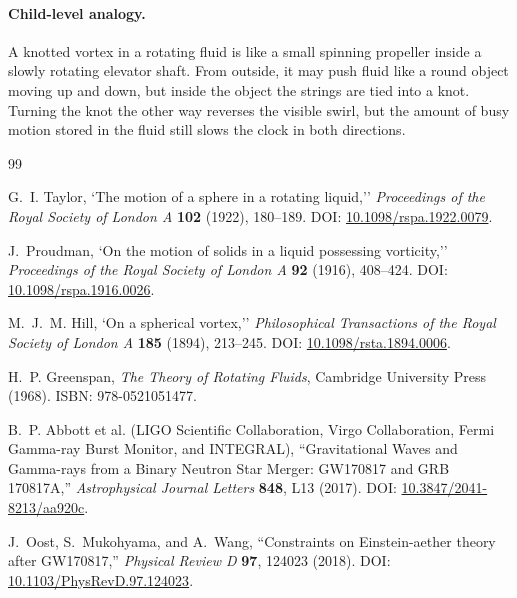 \paragraph{Child-level analogy.}
A knotted vortex in a rotating fluid is like a small spinning propeller inside a
slowly rotating elevator shaft.  From outside, it may push fluid like a round
object moving up and down, but inside the object the strings are tied into a
knot.  Turning the knot the other way reverses the visible swirl, but the amount
of busy motion stored in the fluid still slows the clock in both directions.


\ifresearchtrackincluded\else
\begin{thebibliography}{99}


G.~I. Taylor,
`The motion of a sphere in a rotating liquid,''
\emph{Proceedings of the Royal Society of London A} \textbf{102} (1922), 180--189.
DOI: \href{https://doi.org/10.1098/rspa.1922.0079}{10.1098/rspa.1922.0079}.

J.~Proudman,
`On the motion of solids in a liquid possessing vorticity,''
\emph{Proceedings of the Royal Society of London A} \textbf{92} (1916), 408--424.
DOI: \href{https://doi.org/10.1098/rspa.1916.0026}{10.1098/rspa.1916.0026}.

M.~J.~M. Hill,
`On a spherical vortex,''
\emph{Philosophical Transactions of the Royal Society of London A} \textbf{185} (1894), 213--245.
DOI: \href{https://doi.org/10.1098/rsta.1894.0006}{10.1098/rsta.1894.0006}.

H.~P. Greenspan,
\emph{The Theory of Rotating Fluids},
Cambridge University Press (1968).
ISBN: 978-0521051477.

B.~P. Abbott et al. (LIGO Scientific Collaboration, Virgo Collaboration, Fermi Gamma-ray Burst Monitor, and INTEGRAL),
``Gravitational Waves and Gamma-rays from a Binary Neutron Star Merger: GW170817 and GRB 170817A,''
\emph{Astrophysical Journal Letters} \textbf{848}, L13 (2017).
DOI: \href{https://doi.org/10.3847/2041-8213/aa920c}{10.3847/2041-8213/aa920c}.

J.~Oost, S.~Mukohyama, and A.~Wang,
``Constraints on Einstein-aether theory after GW170817,''
\emph{Physical Review D} \textbf{97}, 124023 (2018).
DOI: \href{https://doi.org/10.1103/PhysRevD.97.124023}{10.1103/PhysRevD.97.124023}.


\end{thebibliography}
